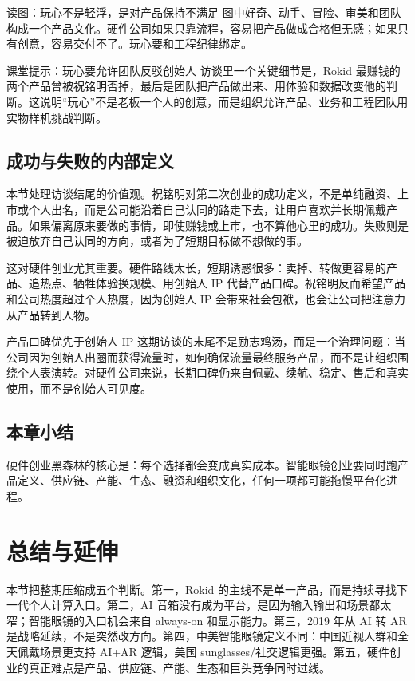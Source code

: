 \documentclass[a4paper]{article}
\begin{document}
\begin{knowledgebox}{读图：玩心不是轻浮，是对产品保持不满足}
图中好奇、动手、冒险、审美和团队构成一个产品文化。硬件公司如果只靠流程，容易把产品做成合格但无感；如果只有创意，容易交付不了。玩心要和工程纪律绑定。
\end{knowledgebox}

\begin{knowledgebox}{课堂提示：玩心要允许团队反驳创始人}
访谈里一个关键细节是，Rokid 最赚钱的两个产品曾被祝铭明否掉，最后是团队把产品做出来、用体验和数据改变他的判断。这说明“玩心”不是老板一个人的创意，而是组织允许产品、业务和工程团队用实物样机挑战判断。
\end{knowledgebox}

\subsection{成功与失败的内部定义}

本节处理访谈结尾的价值观。祝铭明对第二次创业的成功定义，不是单纯融资、上市或个人出名，而是公司能沿着自己认同的路走下去，让用户喜欢并长期佩戴产品。如果偏离原来要做的事情，即使赚钱或上市，也不算他心里的成功。失败则是被迫放弃自己认同的方向，或者为了短期目标做不想做的事。

这对硬件创业尤其重要。硬件路线太长，短期诱惑很多：卖掉、转做更容易的产品、追热点、牺牲体验换规模、用创始人 IP 代替产品口碑。祝铭明反而希望产品和公司热度超过个人热度，因为创始人 IP 会带来社会包袱，也会让公司把注意力从产品转到人物。

\begin{importantbox}{产品口碑优先于创始人 IP}
这期访谈的末尾不是励志鸡汤，而是一个治理问题：当公司因为创始人出圈而获得流量时，如何确保流量最终服务产品，而不是让组织围绕个人表演转。对硬件公司来说，长期口碑仍来自佩戴、续航、稳定、售后和真实使用，而不是创始人可见度。
\end{importantbox}

\subsection{本章小结}

硬件创业黑森林的核心是：每个选择都会变成真实成本。智能眼镜创业要同时跑产品定义、供应链、产能、生态、融资和组织文化，任何一项都可能拖慢平台化进程。

\section{总结与延伸}

本节把整期压缩成五个判断。第一，Rokid 的主线不是单一产品，而是持续寻找下一代个人计算入口。第二，AI 音箱没有成为平台，是因为输入输出和场景都太窄；智能眼镜的入口机会来自 always-on 和显示能力。第三，2019 年从 AI 转 AR 是战略延续，不是突然改方向。第四，中美智能眼镜定义不同：中国近视人群和全天佩戴场景更支持 AI+AR 逻辑，美国 sunglasses/社交逻辑更强。第五，硬件创业的真正难点是产品、供应链、产能、生态和巨头竞争同时过线。
\end{document}
